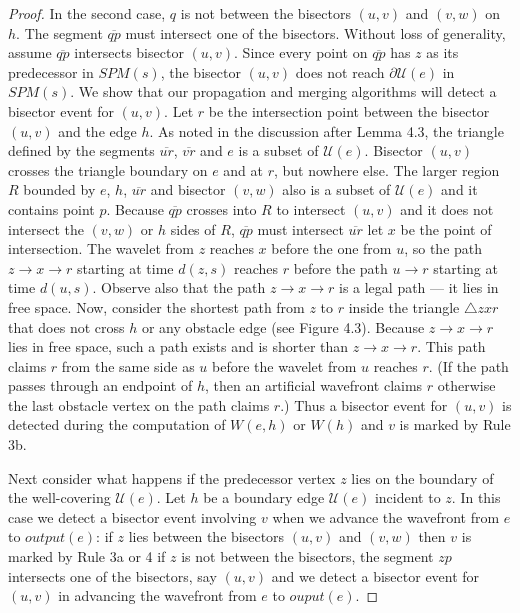 \begin{proof}
	In the second case, $q$ is not between the bisectors $(u,v)$ and $(v,w)$
	on $h$. The segment $\overline{qp}$ must intersect one of the bisectors.
	Without loss of generality, assume $\overline{qp}$ intersects bisector
	$(u,v)$. Since every point on $\overline{qp}$ has $z$ as its predecessor
	in $SPM(s)$, the bisector $(u,v)$ does not reach $\partial\mathcal{U}(e)$
	in $SPM(s)$. We show that our propagation and merging algorithms will
	detect a bisector event for $(u,v)$. Let $r$ be the intersection point
	between the bisector $(u,v)$ and the edge $h$. As noted in the discussion
	after Lemma 4.3, the triangle defined by the segments $\overline{ur}$,
	$\overline{vr}$ and $e$ is a subset of $\mathcal{U}(e)$. Bisector $(u,v)$
	crosses the triangle boundary on $e$ and at $r$, but nowhere else. The
	larger region $R$ bounded by $e$, $h$, $\overline{ur}$ and bisector
	$(v,w)$ also is a subset of $\mathcal{U}(e)$ and it contains point $p$.
	Because $\overline{qp}$ crosses into $R$ to intersect $(u,v)$ and it does
	not intersect the $(v,w)$ or $h$ sides of $R$, $\overline{qp}$ must
	intersect $\overline{ur}$ let $x$ be the point of intersection. The
	wavelet from $z$ reaches $x$ before the one from $u$, so the path $z
	\to x \to r$ starting at time $d(z,s)$ reaches $r$ before the path $u \to
	r$ starting at time $d(u,s)$. Observe also that the path $z \to x \to r$
	is a legal path --- it lies in free space. Now, consider the shortest
	path from $z$ to $r$ inside the triangle $\bigtriangleup zxr$ that does
	not cross $h$ or any obstacle edge (see Figure 4.3). Because $z\to x \to
	r$ lies in free space, such a path exists and is shorter than $z \to x
	\to r$. This path claims $r$ from the same side as $u$ before the wavelet
	from $u$ reaches $r$. (If the path passes through an endpoint of $h$,
	then an artificial wavefront 
	claims $r$ otherwise the last obstacle
	vertex on the path claims $r$.) Thus a bisector event for $(u,v)$ is
	detected during the computation of $W(e,h)$ or $W(h)$ and $v$ is marked
	by Rule 3b.

	Next consider what happens if the predecessor vertex $z$ lies on the
	boundary of the well-covering $\mathcal{U}(e)$. Let $h$ be a boundary
	edge $\mathcal{U}(e)$ incident to $z$. In this case we detect a bisector
	event involving $v$ when we advance the wavefront from $e$ to
	$output(e)$: if $z$ lies between the bisectors $(u,v)$ and $(v,w)$ then
	$v$ is marked by Rule 3a or 4 if $z$ is not between the bisectors, the
	segment $zp$ intersects one of the bisectors, say $(u,v)$ and we detect a
	bisector event for $(u,v)$ in advancing the wavefront from $e$ to
	$ouput(e)$.


\end{proof}
